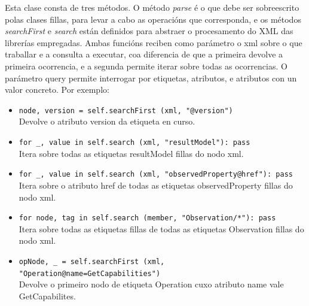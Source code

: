 Esta clase consta de tres métodos. O método \emph{parse} é o que debe ser sobreescrito polas clases fillas, para levar a cabo as operacións que corresponda, e os métodos \emph{searchFirst} e \emph{search} están definidos para abstraer o procesamento do XML das librerías empregadas. Ambas funcións reciben como parámetro o xml sobre o que traballar e a consulta a executar, coa diferencia de que a primeira devolve a primeira ocorrencia, e a segunda permite iterar sobre todas as ocorrencias. O parámetro query permite interrogar por etiquetas, atributos, e atributos con un valor concreto. Por exemplo:

\begin{itemize}
\item \lstinline|node, version = self.searchFirst (xml, "@version")|\\Devolve o atributo version da etiqueta en curso.
\item \lstinline|for _, value in self.search (xml, "resultModel"): pass|\\Itera sobre todas as etiquetas resultModel fillas do nodo xml.
\item \lstinline|for _, value in self.search (xml, "observedProperty@href"): pass|\\Itera sobre o atributo href de todas as etiquetas observedProperty fillas do nodo xml.
\item \lstinline|for node, tag in self.search (member, "Observation/*"): pass|\\Itera sobre todas as etiquetas fillas de todas as etiquetas Observation fillas do nodo xml.
\item \lstinline|opNode, _ = self.searchFirst (xml, "Operation@name=GetCapabilities")|\\Devolve o primeiro nodo de etiqueta Operation cuxo atributo name vale GetCapabilites.
\end{itemize}


